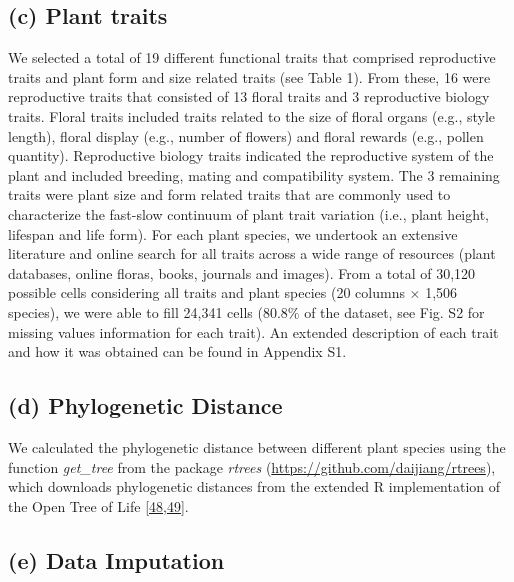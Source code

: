 \documentclass[
  12pt,
  a4paper,
]{article}
\begin{document}
\hypertarget{c-plant-traits}{%
\subsection{(c) Plant traits}\label{c-plant-traits}}

We selected a total of 19 different functional traits that comprised reproductive traits and plant form and size related traits (see Table 1). From these, 16 were reproductive traits that consisted of 13 floral traits and 3 reproductive biology traits. Floral traits included traits related to the size of floral organs (e.g., style length), floral display (e.g., number of flowers) and floral rewards (e.g., pollen quantity). Reproductive biology traits indicated the reproductive system of the plant and included breeding, mating and compatibility system. The 3 remaining traits were plant size and form related traits that are commonly used to characterize the fast-slow continuum of plant trait variation (i.e., plant height, lifespan and life form). For each plant species, we undertook an extensive literature and online search for all traits across a wide range of resources (plant databases, online floras, books, journals and images). From a total of 30,120 possible cells considering all traits and plant species (20 columns × 1,506 species), we were able to fill 24,341 cells (80.8\% of the dataset, see Fig. S2 for missing values information for each trait). An extended description of each trait and how it was obtained can be found in Appendix S1.

\hypertarget{d-phylogenetic-distance}{%
\subsection{(d) Phylogenetic Distance}\label{d-phylogenetic-distance}}

We calculated the phylogenetic distance between different plant species using the function \emph{get\_tree} from the package \emph{rtrees} (\url{https://github.com/daijiang/rtrees}), which downloads phylogenetic distances from the extended R implementation of the Open Tree of Life {[}\protect\hyperlink{ref-smith2018}{48},\protect\hyperlink{ref-jin2019}{49}{]}.

\hypertarget{e-data-imputation}{%
\subsection{(e) Data Imputation}\label{e-data-imputation}}
\end{document}
